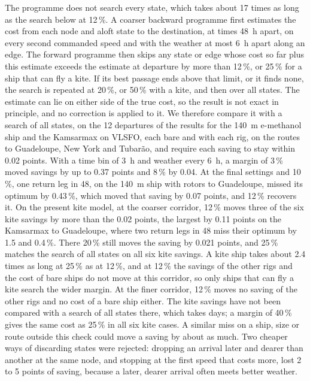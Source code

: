 The programme does not search every state, which takes about 17 times as long as the search below at 12\,\%. A coarser backward programme first estimates the cost from each node and aloft state to the destination, at times \SI{48}{h} apart, on every second commanded speed and with the weather at most \SI{6}{h} apart along an edge. The forward programme then skips any state or edge whose cost so far plus this estimate exceeds the estimate at departure by more than 12\,\%, or 25\,\% for a ship that can fly a kite. If its best passage ends above that limit, or it finds none, the search is repeated at 20\,\%, or 50\,\% with a kite, and then over all states. The estimate can lie on either side of the true cost, so the result is not exact in principle, and no correction is applied to it. We therefore compare it with a search of all states, on the 12 departures of the results for the \SI{140}{m} e-methanol ship and the Kamsarmax on VLSFO, each bare and with each rig, on the routes to Guadeloupe, New York and Tubarão, and require each saving to stay within 0.02 points. With a time bin of \SI{3}{h} and weather every \SI{6}{h}, a margin of 3\,\% moved savings by up to 0.37 points and 8\,\% by 0.04. At the final settings and 10\,\%, one return leg in 48, on the \SI{140}{m} ship with rotors to Guadeloupe, missed its optimum by 0.43\,\%, which moved that saving by 0.07 points, and 12\,\% recovers it. On the present kite model, at the coarser corridor, 12\,\% moves three of the six kite savings by more than the 0.02 points, the largest by 0.11 points on the Kamsarmax to Guadeloupe, where two return legs in 48 miss their optimum by 1.5 and 0.4\,\%. There 20\,\% still moves the saving by 0.021 points, and 25\,\% matches the search of all states on all six kite savings. A kite ship takes about 2.4 times as long at 25\,\% as at 12\,\%, and at 12\,\% the savings of the other rigs and the cost of bare ships do not move at this corridor, so only ships that can fly a kite search the wider margin. At the finer corridor, 12\,\% moves no saving of the other rigs and no cost of a bare ship either. The kite savings have not been compared with a search of all states there, which takes days; a margin of 40\,\% gives the same cost as 25\,\% in all six kite cases. A similar miss on a ship, size or route outside this check could move a saving by about as much. Two cheaper ways of discarding states were rejected: dropping an arrival later and dearer than another at the same node, and stopping at the first speed that costs more, lost 2 to 5 points of saving, because a later, dearer arrival often meets better weather.

